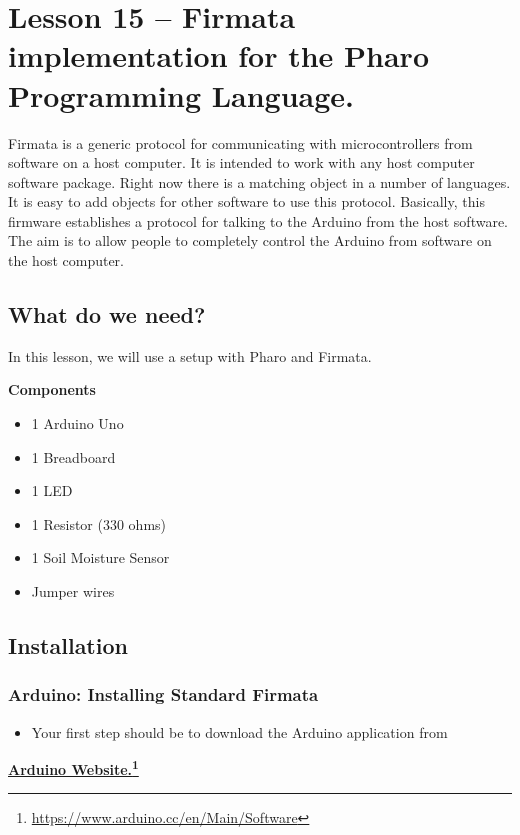\documentclass[10pt,twoside,english]{_support/latex/sbabook/sbabook}
\begin{document}
\frontmatter
\pagestyle{plain}

\tableofcontents*
\clearpage\listoffigures

\mainmatter

\chapter{Lesson 15 –  Firmata implementation for the Pharo Programming Language.}
Firmata is a generic protocol for communicating with microcontrollers from software on a host computer. 
It is intended to work with any host computer software package. Right now there is a matching object in a number of languages. 
It is easy to add objects for other software to use this protocol. 
Basically, this firmware establishes a protocol for talking to the Arduino from the host software. 
The aim is to allow people to completely control the Arduino from software on the host computer.
\section{What do we need?}
In this lesson, we will use a setup with Pharo and Firmata.

\textbf{Components}

\begin{itemize}
\item 1 Arduino Uno
\item 1 Breadboard
\item 1 LED
\item 1 Resistor (330 ohms)
\item 1 Soil Moisture Sensor
\item Jumper wires
\end{itemize}
\section{Installation}\subsection{Arduino: Installing Standard Firmata}
\begin{itemize}
\item Your first step should be to download the Arduino application from 
\end{itemize}

\textbf{\href{https://www.arduino.cc/en/Main/Software}{Arduino Website.}\footnote{\url{https://www.arduino.cc/en/Main/Software}}} 
\end{document}
